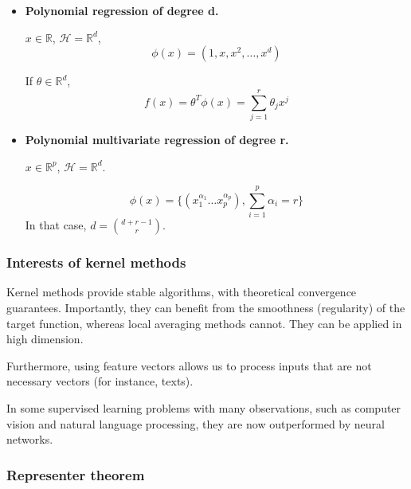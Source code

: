 \documentclass[
10pt, %
a4paper, %
oneside, %
headinclude,footinclude, %
BCOR5mm, %
]{scrartcl}
\begin{document}
\begin{itemize}
    \item \textbf{{Polynomial regression of degree d.}}

	$x\in \mathbb{R}$, $ \mathcal{H}  = \mathbb{R}^d$, 
	\begin{equation}
	    \phi(x) = (1, x, x^2, \dots, x^d)
	\end{equation}

	If $\theta\in \mathbb{R}^d$, 
	\begin{equation*}
	    f(x) = \theta^T\phi(x) = \sum^{r}_{j=1} \theta_jx^j
	\end{equation*}
    \item \textbf{{Polynomial multivariate regression of degree r.}}

	$x\in \mathbb{R}^p$, $ \mathcal{H}  = \mathbb{R}^d$.

	\begin{equation*}
	    \phi(x) = \{(x_1^{\alpha_1}\dots x_p^{\alpha_p}),{ \sum^{p}_{i=1} \alpha_i = r}\}
	\end{equation*}
	In that case, $d = \binom{d+r-1}{r}$.


\end{itemize}

\subsubsection{\large\color{Periwinkle}Interests of kernel methods}

Kernel methods provide stable algorithms, with theoretical convergence guarantees. Importantly, they can benefit from the smoothness (regularity) of the target function, whereas local averaging methods cannot. They can be applied in high dimension.

Furthermore, using feature vectors allows us to process inputs that are not necessary vectors (for instance, texts).

In some supervised learning problems with many observations, such as computer vision and natural language processing, they are now outperformed by neural networks.

\subsubsection{\large\color{Periwinkle}Representer theorem}
\end{document}
